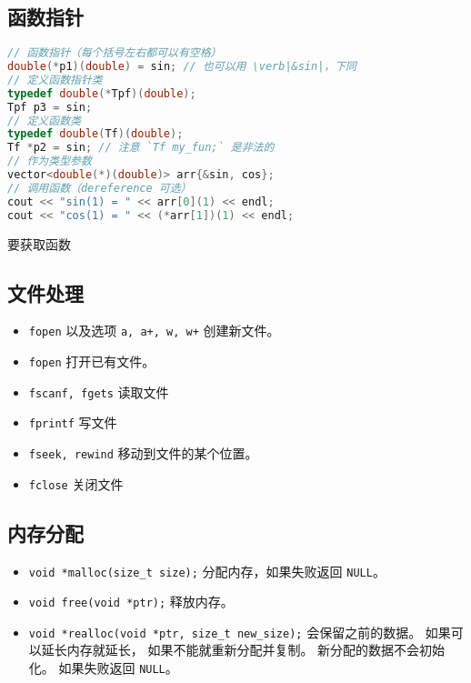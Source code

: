 \subsection{函数指针}
\begin{lstlisting}[language=cpp]
// 函数指针（每个括号左右都可以有空格）
double(*p1)(double) = sin; // 也可以用 \verb|&sin|，下同
// 定义函数指针类
typedef double(*Tpf)(double);
Tpf p3 = sin;
// 定义函数类
typedef double(Tf)(double);
Tf *p2 = sin; // 注意 `Tf my_fun;` 是非法的
// 作为类型参数
vector<double(*)(double)> arr{&sin, cos};
// 调用函数（dereference 可选）
cout << "sin(1) = " << arr[0](1) << endl;
cout << "cos(1) = " << (*arr[1])(1) << endl;
\end{lstlisting}

要获取函数

\subsection{文件处理}
\begin{itemize}
\item \verb|fopen| 以及选项 \verb|a, a+, w, w+| 创建新文件。
\item \verb|fopen| 打开已有文件。
\item \verb|fscanf, fgets| 读取文件
\item \verb|fprintf| 写文件
\item \verb|fseek, rewind| 移动到文件的某个位置。
\item \verb|fclose| 关闭文件
\end{itemize}

\subsection{内存分配}
\begin{itemize}
\item \verb|void *malloc(size_t size);| 分配内存，如果失败返回 \verb|NULL|。
\item \verb|void free(void *ptr);| 释放内存。
\item \verb|void *realloc(void *ptr, size_t new_size);| 会保留之前的数据。 如果可以延长内存就延长， 如果不能就重新分配并复制。 新分配的数据不会初始化。 如果失败返回 \verb|NULL|。
\end{itemize}
